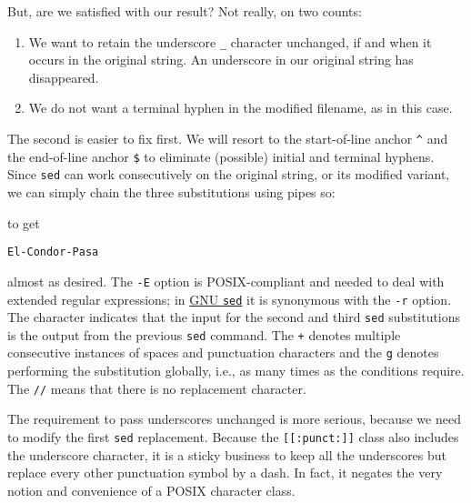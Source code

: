 \documentclass[
  a4paper,
]{article}
\newenvironment{Shaded}{\begin{snugshade}}{\end{snugshade}}
\newcommand{\AttributeTok}[1]{\textcolor[rgb]{0.80,0.80,0.80}{#1}}
\newcommand{\DataTypeTok}[1]{\textcolor[rgb]{0.87,0.87,0.75}{#1}}
\newcommand{\FunctionTok}[1]{\textcolor[rgb]{0.94,0.94,0.56}{#1}}
\newcommand{\KeywordTok}[1]{\textcolor[rgb]{0.94,0.87,0.69}{#1}}
\newcommand{\OperatorTok}[1]{\textcolor[rgb]{0.94,0.94,0.82}{#1}}
\newcommand{\StringTok}[1]{\textcolor[rgb]{0.80,0.58,0.58}{#1}}
\providecommand{\tightlist}{%
  \setlength{\itemsep}{0pt}\setlength{\parskip}{0pt}}
\begin{document}
But, are we satisfied with our result? Not really, on two counts:

\begin{enumerate}
\tightlist
\item
  We want to retain the underscore \texttt{\_} character unchanged, if
  and when it occurs in the original string. An underscore in our
  original string has disappeared.
\item
  We do not want a terminal hyphen in the modified filename, as in this
  case.
\end{enumerate}

The second is easier to fix first. We will resort to the start-of-line
anchor \texttt{\^{}} and the end-of-line anchor \texttt{\$} to eliminate
(possible) initial and terminal hyphens. Since \texttt{sed} can work
consecutively on the original string, or its modified variant, we can
simply chain the three substitutions using pipes so:

\begin{Shaded}
\end{Shaded}

to get

\begin{verbatim}
El-Condor-Pasa
\end{verbatim}

almost as desired. The \texttt{-E} option is POSIX-compliant and needed
to deal with extended regular expressions; in
\href{https://www.gnu.org/software/sed/manual/html_node/Command_002dLine-Options.html}{GNU
\texttt{sed}} it is synonymous with the \texttt{-r} option. The
\texttt{\textbar{}} character indicates that the input for the second
and third \texttt{sed} substitutions is the output from the previous
\texttt{sed} command. The \texttt{+} denotes multiple consecutive
instances of spaces and punctuation characters and the \texttt{g}
denotes performing the substitution globally, i.e., as many times as the
conditions require. The \texttt{//} means that there is no replacement
character.

The requirement to pass underscores unchanged is more serious, because
we need to modify the first \texttt{sed} replacement. Because the
\texttt{{[}{[}:punct:{]}{]}} class also includes the underscore
character, it is a sticky business to keep all the underscores but
replace every other punctuation symbol by a dash. In fact, it negates
the very notion and convenience of a POSIX character class.
\end{document}
